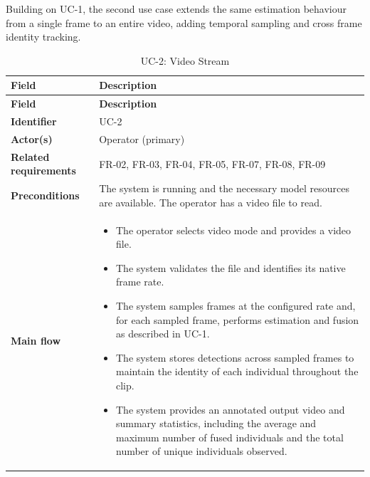 
Building on UC-1, the second use case extends the same estimation behaviour from a single frame to an entire video, adding temporal sampling and cross frame identity tracking.

\begin{longtable}{|
    >{\raggedright\arraybackslash}p{3.0cm}|
    >{\raggedright\arraybackslash}p{\dimexpr\textwidth-3.0cm-4\tabcolsep-3\arrayrulewidth\relax}|
}
\caption{UC-2: Video Stream}
\label{tab:uc2} \\

\hline
\textbf{Field} & \textbf{Description} \\
\hline
\endfirsthead

\hline
\textbf{Field} & \textbf{Description} \\
\hline
\endhead

\textbf{Identifier} &
UC-2
\\
\hline

\textbf{Actor(s)} &
Operator (primary)
\\
\hline

\textbf{Related requirements} &
FR-02, FR-03, FR-04, FR-05, FR-07, FR-08, FR-09
\\
\hline

\textbf{Preconditions} &
The system is running and the necessary model resources are available. The operator has a video file to read.
\\
\hline

\textbf{Main flow} &
\begin{itemize}[leftmargin=16pt, itemsep=0pt, topsep=0pt]
    \item The operator selects video mode and provides a video file.

    \item The system validates the file and identifies its native frame rate.

    \item The system samples frames at the configured rate and, for each sampled frame, performs estimation and fusion as described in UC-1.

    \item The system stores detections across sampled frames to maintain the identity of each individual throughout the clip.

    \item The system provides an annotated output video and summary statistics, including the average and maximum number of fused individuals and the total number of unique individuals observed.
\end{itemize}
\\
\hline


\end{longtable}
